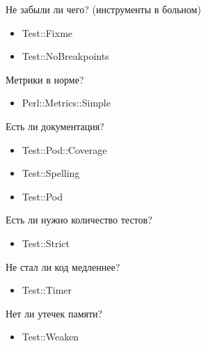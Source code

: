 \documentclass[aspectratio=169]{beamer}
\begin{document}
\begin{frame}{Не забыли ли чего? (инструменты в больном)}
\begin{itemize}
\item Test::Fixme
\item Test::NoBreakpoints
\end{itemize}
\end{frame}

\begin{frame}{Метрики в норме?}
\begin{itemize}
\item Perl::Metrics::Simple
\end{itemize}
\end{frame}

\begin{frame}{Есть ли документация?}
\begin{itemize}
\item Test::Pod::Coverage
\item Test::Spelling
\item Test::Pod
\end{itemize}
\end{frame}

\begin{frame}{Есть ли нужно количество тестов?}
\begin{itemize}
\item Test::Strict
\end{itemize}
\end{frame}

\begin{frame}{Не стал ли код медленнее?}
\begin{itemize}
\item Test::Timer
\end{itemize}
\end{frame}

\begin{frame}{Нет ли утечек памяти?}
\begin{itemize}
\item Test::Weaken
\end{itemize}
\end{frame}
\end{document}
